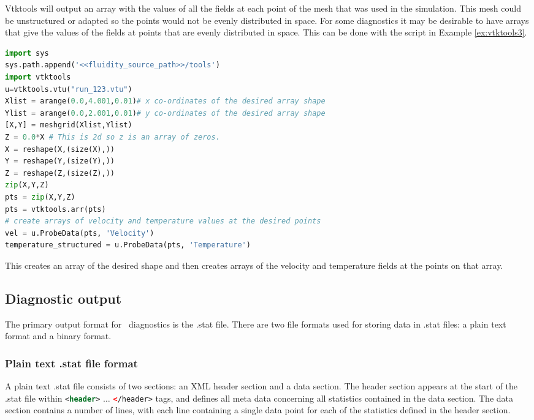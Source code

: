 Vtktools will output an array with the values of all the fields at each point of the mesh that was used in the simulation. This mesh could be unstructured or adapted so the  points would not be evenly distributed in space. For some diagnostics it may be desirable to have arrays that give the values of the fields at points that are evenly distributed in space. This can be done with the script in Example \ref{ex:vtktools3}.
\begin{example}
  \begin{lstlisting}[language=Python]
import sys
sys.path.append('<<fluidity_source_path>>/tools')
import vtktools
u=vtktools.vtu("run_123.vtu")
Xlist = arange(0.0,4.001,0.01)# x co-ordinates of the desired array shape
Ylist = arange(0.0,2.001,0.01)# y co-ordinates of the desired array shape
[X,Y] = meshgrid(Xlist,Ylist)
Z = 0.0*X # This is 2d so z is an array of zeros.
X = reshape(X,(size(X),))
Y = reshape(Y,(size(Y),))
Z = reshape(Z,(size(Z),))
zip(X,Y,Z)
pts = zip(X,Y,Z)
pts = vtktools.arr(pts)
# create arrays of velocity and temperature values at the desired points
vel = u.ProbeData(pts, 'Velocity') 
temperature_structured = u.ProbeData(pts, 'Temperature') 
  \end{lstlisting}
\caption{This creates an array of the desired shape and then creates arrays of the velocity and temperature fields at the points on that array.}
\label{ex:vtktools3}
\end{example}
 

\subsection{Diagnostic output}
\label{sect:diagnostic_output}

The primary output format for \fluidity\ diagnostics is the .stat file. There
are two file formats used for storing data in .stat files: a plain text format
and a binary format.

\subsubsection{Plain text .stat file format}

A plain text .stat file consists of two sections: an XML header section and a
data section. The header section appears at the start of the .stat file within
\lstinline[language = XML]*<header>* $\ldots$
\lstinline[language = XML]*</header>* tags, and defines all meta data concerning
all statistics contained in the data section. The data section contains a number of lines,
with each line containing a single data point for each of the statistics defined in the header
section.

